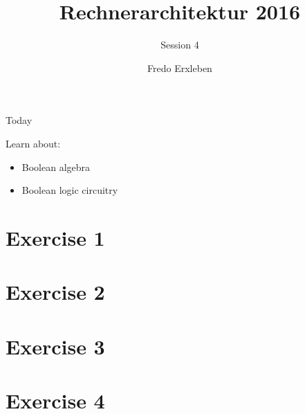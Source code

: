 \documentclass[11pt]{tudbeamer}
\title{Rechnerarchitektur 2016}
\subtitle{Session 4}
\author{Fredo Erxleben}
\begin{document}
  \maketitle

\begin{frame}{Today}

	Learn about:
	\begin{itemize}
		\item Boolean algebra
		\item Boolean logic circuitry
	\end{itemize}

\end{frame}

\section{Exercise 1}
\section{Exercise 2}
\section{Exercise 3}
\section{Exercise 4}
\end{document}
